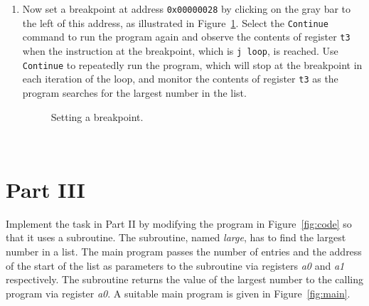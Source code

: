 \documentclass[epsfig,10pt,fullpage]{article}
\begin{document}
\begin{enumerate}
\item Now set a breakpoint at address \texttt{0x00000028} by clicking on the gray bar to
the left of this address, as illustrated in Figure~\ref{fig:bp}. Select the \texttt{Continue}
command to run the program again and observe the contents of register \texttt{t3} when 
the instruction at the breakpoint, which is \texttt{j loop}, is reached. Use 
\texttt{Continue} to repeatedly run the program, which will stop at the breakpoint in each
iteration of the loop, and monitor 
the contents of register \texttt{t3} as the program searches for 
the largest number in the list.

\begin{figure}[H]
	\begin{center}
    \setlength{\fboxsep}{0pt}
	\end{center}
	\caption{Setting a breakpoint.}
\label{fig:bp}
\end{figure} 

\end{enumerate}

~\\
\section*{Part III}

Implement the task in Part II by modifying the program in Figure~\ref{fig:code} so that it
uses a subroutine. The subroutine, named {\it large}, has to find the largest number in a list.
The main program passes the number of entries and the address of the start of the
list as parameters to the subroutine via registers {\it a0} and {\it a1} respectively.
The subroutine returns the value of the largest number to the calling program
via register {\it a0}. A suitable main program is given in Figure~\ref{fig:main}.
~\\
\end{document}
